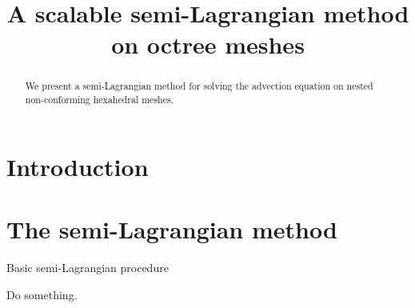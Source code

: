 \documentclass[11pt]{article}
\title{A scalable semi-Lagrangian method on octree meshes}
\author{}
\begin{document}
\maketitle

\begin{abstract}
We present a semi-Lagrangian method for solving the advection equation
on nested non-conforming hexahedral meshes.
\end{abstract}

\section{Introduction}

\section{The semi-Lagrangian method}

\begin{algorithm}
  \caption{Basic semi-Lagrangian procedure}
  \begin{algorithmic}
    \STATE Do something.
  \end{algorithmic}
\end{algorithm}
\end{document}
